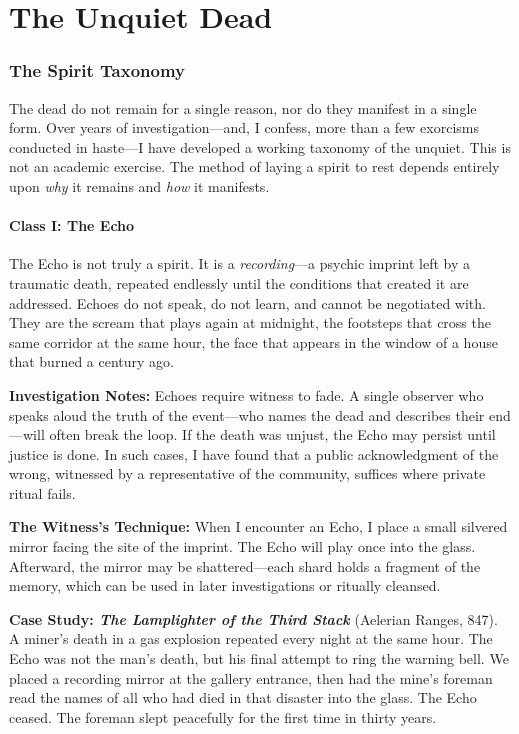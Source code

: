 \part{The Unquiet Dead}

\section{The Spirit Taxonomy}

The dead do not remain for a single reason, nor do they manifest in a single form. Over years of investigation---and, I confess, more than a few exorcisms conducted in haste---I have developed a working taxonomy of the unquiet. This is not an academic exercise. The method of laying a spirit to rest depends entirely upon \emph{why} it remains and \emph{how} it manifests.

\subsection{Class I: The Echo}

The Echo is not truly a spirit. It is a \emph{recording}---a psychic imprint left by a traumatic death, repeated endlessly until the conditions that created it are addressed. Echoes do not speak, do not learn, and cannot be negotiated with. They are the scream that plays again at midnight, the footsteps that cross the same corridor at the same hour, the face that appears in the window of a house that burned a century ago.

\textbf{Investigation Notes:} Echoes require witness to fade. A single observer who speaks aloud the truth of the event---who names the dead and describes their end---will often break the loop. If the death was unjust, the Echo may persist until justice is done. In such cases, I have found that a public acknowledgment of the wrong, witnessed by a representative of the community, suffices where private ritual fails.

\textbf{The Witness's Technique:} When I encounter an Echo, I place a small silvered mirror facing the site of the imprint. The Echo will play once into the glass. Afterward, the mirror may be shattered---each shard holds a fragment of the memory, which can be used in later investigations or ritually cleansed.

\textbf{Case Study: \emph{The Lamplighter of the Third Stack}} (Aelerian Ranges, 847). A miner's death in a gas explosion repeated every night at the same hour. The Echo was not the man's death, but his final attempt to ring the warning bell. We placed a recording mirror at the gallery entrance, then had the mine's foreman read the names of all who had died in that disaster into the glass. The Echo ceased. The foreman slept peacefully for the first time in thirty years.

